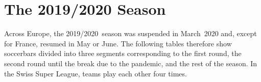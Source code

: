 \documentclass[a4paper,12pt]{ltxdoc}
\begin{document}
\section{The 2019/2020 Season}

Across Europe, the 2019/2020~season was suspended in March~2020
and, except for France, resumed in May or June.
The following tables therefore show soccerbars
divided into three segments corresponding to the first round,
the second round until the break due to the pandemic,
and the rest of the season.
In the Swiss Super League, teams play each other four times.

\sbZeroDots
\renewcommand{\arraystretch}{1.2}

\clearpage
\clearpage
\clearpage
\clearpage
\clearpage

\vfill


\end{document}
